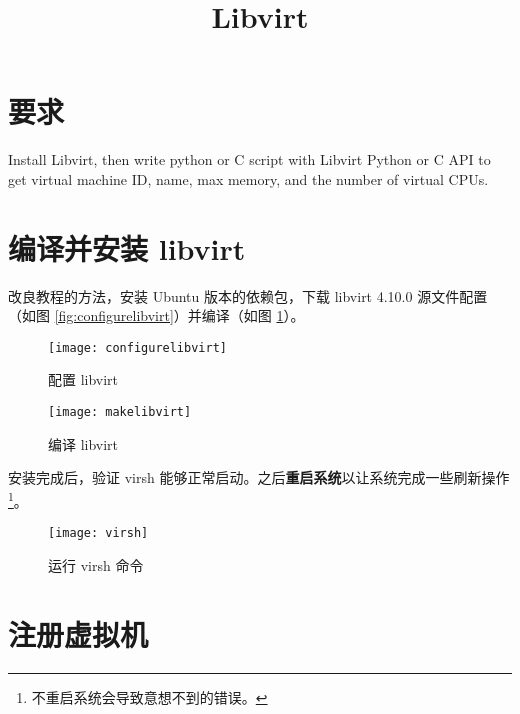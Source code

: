 

    \title{Libvirt}
    \maketitle
    \tableofcontents

    \section{要求}
    Install Libvirt, then write python or C script with Libvirt Python or C API to get virtual machine ID, name, max memory, and the number of virtual CPUs.
    
    \section{编译并安装 libvirt}

    改良教程\cite{libvirt}的方法，安装 Ubuntu 版本的依赖包，下载 libvirt 4.10.0 源文件配置（如图 \ref{fig:configurelibvirt}）并编译（如图 \ref{fig:makelibvirt}）。


    \begin{figure}[H]
        \centering
        \begin{minipage}{0.48\textwidth}
            \centering
            \texttt{[image: configurelibvirt]}
            \caption{配置 libvirt}\label{fig:configurelibvirt}
        \end{minipage}
        \begin{minipage}{0.48\textwidth}
            \centering
            \texttt{[image: makelibvirt]}
            \caption{编译 libvirt}\label{fig:makelibvirt}
        \end{minipage}
    \end{figure}

    安装完成后，验证 virsh 能够正常启动。之后\textbf{重启系统}以让系统完成一些刷新操作\footnote{不重启系统会导致意想不到的错误。}。

    \begin{figure}[H]
        \centering
        \texttt{[image: virsh]}
        \caption{运行 virsh 命令}\label{fig:virsh}
    \end{figure}

    \section{注册虚拟机}

